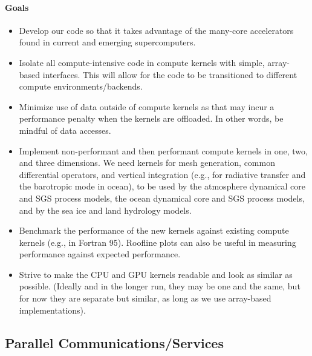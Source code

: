 \documentclass{article}
\begin{document}
\paragraph{Goals}
\begin{itemize}
    \item Develop our code so that it takes advantage of the many-core accelerators found in current and emerging supercomputers.
    \item Isolate all compute-intensive code in compute kernels with simple, array-based interfaces.  This will allow for the code to be transitioned to different compute environments/backends.
    \item Minimize use of data outside of compute kernels as that may incur a performance penalty when the kernels are offloaded.  In other words, be mindful of data accesses.
    \item Implement non-performant and then performant compute kernels in one, two, and three dimensions. We need kernels for mesh generation, common differential operators, and vertical integration (e.g., for radiative transfer and the barotropic mode in ocean), to be used by the atmosphere dynamical core and SGS process models, the ocean dynamical core and SGS process models, and by the sea ice and land hydrology models.
    \item Benchmark the performance of the new kernels against existing compute kernels (e.g., in Fortran 95).  Roofline plots can also be useful in measuring performance against expected performance.
    \item Strive to make the CPU and GPU kernels readable and look as similar as possible. (Ideally and in the longer run, they may be one and the same, but for now they are separate but similar, as long as we use array-based implementations). 
\end{itemize}



\subsection{Parallel Communications/Services}

\end{document}
